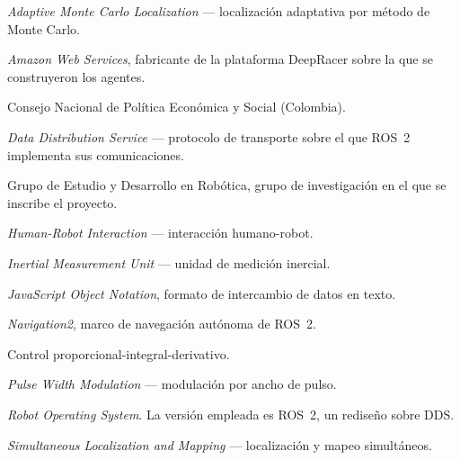 
\begin{description}[style=nextline,leftmargin=1.5em,itemsep=0em]
  \item[AMCL] \textit{Adaptive Monte Carlo Localization} — localización adaptativa
    por método de Monte Carlo.
  \item[AWS] \textit{Amazon Web Services}, fabricante de la plataforma DeepRacer sobre la que se construyeron los agentes.
  \item[CONPES] Consejo Nacional de Política Económica y Social (Colombia).
  \item[DDS] \textit{Data Distribution Service} — protocolo de transporte sobre
    el que ROS~2 implementa sus comunicaciones.
  \item[GED] Grupo de Estudio y Desarrollo en Robótica, grupo de investigación en
    el que se inscribe el proyecto.
  \item[HRI] \textit{Human-Robot Interaction} — interacción humano-robot.
  \item[IMU] \textit{Inertial Measurement Unit} — unidad de medición inercial.
  \item[JSON] \textit{JavaScript Object Notation}, formato de intercambio de
    datos en texto.
  \item[Nav2] \textit{Navigation2}, marco de navegación autónoma de ROS~2.
  \item[PID] Control proporcional-integral-derivativo.
  \item[PWM] \textit{Pulse Width Modulation} — modulación por ancho de pulso.
  \item[ROS] \textit{Robot Operating System}. La versión empleada es ROS~2, un
    rediseño sobre DDS.
  \item[SLAM] \textit{Simultaneous Localization and Mapping} — localización y
    mapeo simultáneos.
\end{description}

